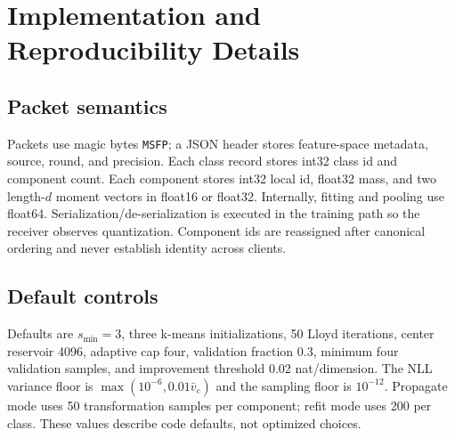 \section{Implementation and Reproducibility Details}\label{app:repro}
\subsection{Packet semantics}
Packets use magic bytes \texttt{MSFP}; a JSON header stores feature-space metadata, source, round, and precision. Each class record stores int32 class id and component count. Each component stores int32 local id, float32 mass, and two length-$d$ moment vectors in float16 or float32. Internally, fitting and pooling use float64. Serialization/de-serialization is executed in the training path so the receiver observes quantization. Component ids are reassigned after canonical ordering and never establish identity across clients.

\subsection{Default controls}
Defaults are $s_{\min}=3$, three k-means initializations, 50 Lloyd iterations, center reservoir 4096, adaptive cap four, validation fraction 0.3, minimum four validation samples, and improvement threshold 0.02 nat/dimension. The NLL variance floor is $\max(10^{-6},0.01\bar v_c)$ and the sampling floor is $10^{-12}$. Propagate mode uses 50 transformation samples per component; refit mode uses 200 per class. These values describe code defaults, not optimized choices.


